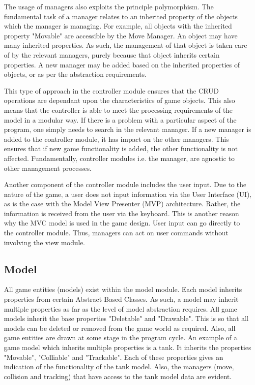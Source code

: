 \documentclass[10pt,twocolumn]{witseiepaper}
\begin{document}
The usage of managers also exploits the principle polymorphism. The fundamental task of a manager relates to an inherited property of the objects which the manager is managing. For example, all objects with the inherited property "Movable" are accessible by the Move Manager. An object may have many inherited properties. As such, the management of that object is taken care of by the relevant managers, purely because that object inherits certain properties. A new manager may be added based on the inherited properties of objects, or as per the abstraction requirements.

This type of approach in the controller module ensures that the CRUD operations are dependant upon the characteristics of game objects. This also means that the controller is able to meet the processing requirements of the model in a modular way. If there is a problem with a particular aspect of the program, one simply needs to search in the relevant manager. If a new manager is added to the controller module, it has impact on the other managers. This ensures that if new game functionality is added, the other functionality is not affected. Fundamentally, controller modules i.e. the manager, are agnostic to other management processes.

Another component of the controller module includes the user input. Due to the nature of the game, a user does not input information via the User Interface (UI), as is the case with the Model View Presenter (MVP) architecture. Rather, the information is received from the user via the keyboard. This is another reason why the MVC model is used in the game design. User input can go directly to the controller module. Thus, managers can act on user commands without involving the view module.

\subsection{Model}
All game entities (models) exist within the model module. Each model inherits properties from certain Abstract Based Classes. As such, a model may inherit multiple properties as far as the level of model abstraction requires. All game models inherit the base properties "Deletable" and "Drawable". This is so that all models can be deleted or removed from the game world as required. Also, all game entities are drawn at some stage in the program cycle. An example of a game model which inherits multiple properties is a tank. It inherits the properties "Movable", "Colliable" and "Trackable". Each of these properties gives an indication of the functionality of the tank model. Also, the managers (move, collision and tracking) that have access to the tank model data are evident.
\end{document}
